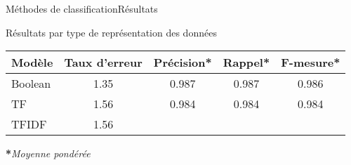 \begin{frame}{Méthodes de classification}{Résultats}
  
  Résultats par type de représentation des données
  
  \begin{center}
    \scriptsize
    \begin{tabular}{l cccc} 
      \hline
      \textbf{Modèle} & \textbf{Taux d'erreur}& \textbf{Précision*} & \textbf{Rappel*} & \textbf{F-mesure*}\\
      \hline
      Boolean & 1.35 & 0.987 & 0.987 & 0.986\\
      TF      & 1.56 & 0.984 & 0.984 & 0.984\\
      TFIDF   & 1.56\\
    \end{tabular}
  \end{center}    
    \scriptsize\textbf{*}\textit{Moyenne pondérée}

  
\end{frame}
